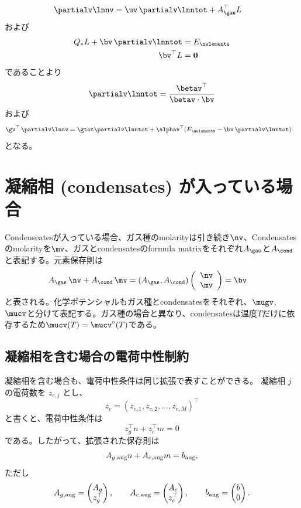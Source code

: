 \begin{align}
\label{eq:update_tce_bic}
    \partialv \lnnv &=  \uv \, \partialv \lnntot + A_\gas^\top L
\end{align}
および
\begin{align}
\label{eq:update_tce_2bic}
    Q_\ast L +  \bv \, \partialv \lnntot  &= E_\nelements \\
\label{eq:update_tce_3bic}
    \bv^\top L &= \boldsymbol{0}
\end{align}
であることより
\begin{align}
    \partialv \lnntot = \frac{\betav^\top}{\betav \cdot \bv}
\end{align}
および
\begin{align}
\label{eq:update_tce_bicz}
    \gv^\top \, \partialv \lnnv &=   \gtot \partialv \lnntot + \alphav^\top ( E_\nelements - \bv \, \partialv \lnntot )
\end{align}
となる。

\section{凝縮相 (condensates) が入っている場合}\label{sec:condopt}



Condenseatesが入っている場合、ガス種のmolarityは引き続き$\nv$、Condensatesのmolarityを$\mv$、ガスとcondensatesのformula matrixをそれぞれ$A_\gas$と$A_\cond$と表記する。元素保存則は
\begin{align}
   A_\gas \, \nv + A_\cond \, \mv  &= (A_\gas, A_\cond) \left(
\begin{array}{c}
\nv \\
\mv
\end{array}
\right) = \bv 
\end{align}
と表される。化学ポテンシャルもガス種とcondensatesをそれぞれ、$\mugv$, $\mucv$と分けて表記する。ガス種の場合と異なり、condensatesは温度$T$だけに依存するため$\mucv (T) = \mucv^\circ (T)$である。

\subsection*{凝縮相を含む場合の電荷中性制約}
  凝縮相を含む場合も、電荷中性条件は同じ拡張で表すことができる。
  凝縮相 $j$ の電荷数を $z_{c,j}$ とし、
  \[
    z_c = (z_{c,1}, z_{c,2}, \ldots, z_{c,M})^\top
  \]
  と書くと、電荷中性条件は
  \[
    z_g^\top n + z_c^\top m = 0
  \]
  である。したがって、拡張された保存則は
  \[
    A_{g,{\rm aug}} n + A_{c,{\rm aug}} m = b_{\rm aug},
  \]
  ただし
  \[
    A_{g,{\rm aug}}
    =
    \begin{pmatrix}
      A_g \\
      z_g^\top
    \end{pmatrix},
    \qquad
    A_{c,{\rm aug}}
    =
    \begin{pmatrix}
      A_c \\
      z_c^\top
    \end{pmatrix},
    \qquad
    b_{\rm aug}
    =
    \begin{pmatrix}
      b \\
      0
    \end{pmatrix}.
  \]

